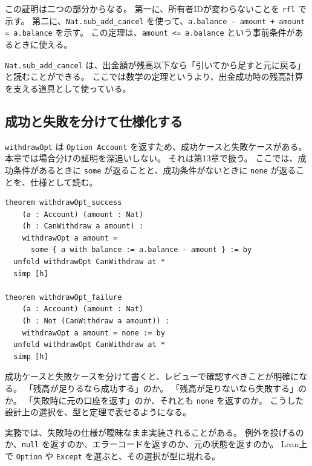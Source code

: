この証明は二つの部分からなる。
第一に、所有者IDが変わらないことを \texttt{rfl} で示す。
第二に、\texttt{Nat.sub\_add\_cancel} を使って、\texttt{a.balance - amount + amount = a.balance} を示す。
この定理は、\texttt{amount <= a.balance} という事前条件があるときに使える。

\begin{intuitionbox}
\texttt{Nat.sub\_add\_cancel} は、出金額が残高以下なら「引いてから足すと元に戻る」と読むことができる。
ここでは数学の定理というより、出金成功時の残高計算を支える道具として使っている。
\end{intuitionbox}

\subsection{成功と失敗を分けて仕様化する}

\texttt{withdrawOpt} は \texttt{Option Account} を返すため、成功ケースと失敗ケースがある。
本章では場合分けの証明を深追いしない。
それは第13章で扱う。
ここでは、成功条件があるときに \texttt{some} が返ることと、成功条件がないときに \texttt{none} が返ることを、仕様として読む。

\begin{listing}[htbp]
\begin{verbatim}
theorem withdrawOpt_success
    (a : Account) (amount : Nat)
    (h : CanWithdraw a amount) :
    withdrawOpt a amount =
      some { a with balance := a.balance - amount } := by
  unfold withdrawOpt CanWithdraw at *
  simp [h]

theorem withdrawOpt_failure
    (a : Account) (amount : Nat)
    (h : Not (CanWithdraw a amount)) :
    withdrawOpt a amount = none := by
  unfold withdrawOpt CanWithdraw at *
  simp [h]
\end{verbatim}
\caption{成功時・失敗時の戻り値仕様}
\label{lst:ch04_withdraw_option_spec}
\end{listing}

成功ケースと失敗ケースを分けて書くと、レビューで確認すべきことが明確になる。
「残高が足りるなら成功する」のか。
「残高が足りないなら失敗する」のか。
「失敗時に元の口座を返す」のか、それとも \texttt{none} を返すのか。
こうした設計上の選択を、型と定理で表せるようになる。

\begin{softwarebox}
実務では、失敗時の仕様が曖昧なまま実装されることがある。
例外を投げるのか、\texttt{null} を返すのか、エラーコードを返すのか、元の状態を返すのか。
Lean上で \texttt{Option} や \texttt{Except} を選ぶと、その選択が型に現れる。
\end{softwarebox}

